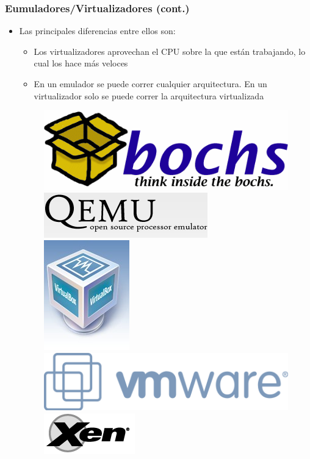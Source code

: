 \begin{frame}
	\frametitle{Eumuladores/Virtualizadores (cont.)}
	\begin{itemize}
		\item Las principales diferencias entre ellos son:
		\begin{itemize}
			\item Los virtualizadores aprovechan el CPU sobre la que están trabajando, lo cual los hace más veloces
			\item En un emulador se puede correr cualquier arquitectura. En un virtualizador solo se puede correr la arquitectura virtualizada
		\end{itemize}
		\begin{figure}[h]
			\includegraphics[scale=0.2]{images/bochs.png}
			\hspace{30px}
			\includegraphics[scale=0.2]{images/quemu.png}
			\hspace{30px}
			\includegraphics[scale=0.2]{images/virtualbox.png}
			\hspace{30px}
			\includegraphics[scale=0.2]{images/vmware.png}
			\hspace{30px}
			\includegraphics[scale=0.2]{images/xen.png}
		\end{figure}		
	\end{itemize}
\end{frame}

